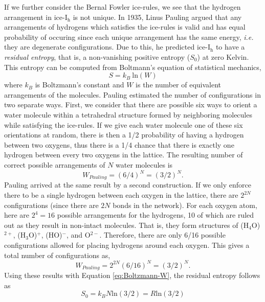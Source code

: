 If we further consider the Bernal Fowler ice-rules, we see that the
hydrogen arrangement in ice-I$_\mathrm{h}$ is not unique. In 1935,
Linus Pauling argued that any arrangements of hydrogens which
satisfies the ice-rules is valid and has equal probability of
occuring since each unique arrangement has the same energy,
\textit{i.e.} they are degenerate configurations. Due to this, he
predicted ice-I$_\mathrm{h}$ to have a \textit{residual entropy}, that is, a
non-vanishing positive entropy ($S_{0}$) at zero Kelvin. This entropy
can be computed from Boltmann's equation of statistical mechanics,
\begin{equation}\label{eq:Boltzmann-W}
S = k_{B}~\mathrm{ln}(W)
\end{equation}
where $k_{B}$ is Boltzmann's constant and $W$ is the number of
equivalent arrangements of the molecules. Pauling estimated the number
of configurations in two separate ways.\cite{Pauling1935} First, we
consider that there are possible six ways to orient a water molecule
within a tetrahedral structure formed by neighboring molecules while
satisfying the ice-rules. If we give each water molecule one of these
six orientations at random, there is then a 1/2 probability of having
a hydrogen between two oxygens, thus there is a 1/4 chance that there
is exactly one hydrogen between every two oxygens in the lattice. The
resulting number of correct possible arrangements of $N$ water
molecules is
\begin{equation} \label{eq:Pauling-1}
W_{Pauling} = (6/4)^{N} = (3/2)^{N}.
\end{equation}   
Pauling arrived at the same result by a second construction. If we
 only enforce there to be a single hydrogen
between each oxygen in the lattice, there are $2^{2N}$ configurations
(since there are $2N$ bonds in the network). For each oxygen atom,
here are $2^{4} = 16$ possible arrangements for the hydrogens, 10 of
which are ruled out as they result in non-intact
molecules. That is, they form structures of (H$_{4}$O)$^{2+}$,
(H$_{3}$O)$^{+}$, (HO)$^{-}$, and O$^{2-}$. Therefore, there are only
6/16 possible configurations allowed for placing hydrogens around each
oxygen. This gives a total number of configurations as,
\begin{equation}
W_{Pauling} = 2^{2N}(6/16)^{N} = (3/2)^{N}.
\end{equation}
Using these results with Equation \eqref{eq:Boltzmann-W}, the residual
entropy follows as
\begin{equation}
S_{0} = k_{B}N\mathrm{ln}(3/2) = R\mathrm{ln}(3/2)
\end{equation}
